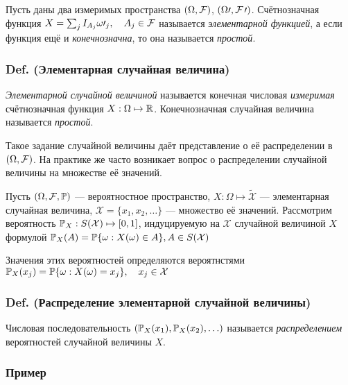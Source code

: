 Пусть даны два измеримых пространства \((\Omega, \mathcal F)\),
\((\Omega\prime, \mathcal F\prime)\). Счётнозначная функция
\hbox{$X = \sum_j I_{A_j}\omega\prime_j, \quad A_j\in\mathcal F$}
называется \emph{элементарной функцией}, а если функция ещё и
\emph{конечнозначна}, то она называется \emph{простой}.

\subsubsection{Def. (Элементарная случайная
величина)}\label{def.-ux44dux43bux435ux43cux435ux43dux442ux430ux440ux43dux430ux44f-ux441ux43bux443ux447ux430ux439ux43dux430ux44f-ux432ux435ux43bux438ux447ux438ux43dux430}

\emph{Элементарной случайной величиной} называется конечная числовая
\emph{измеримая} счётнозначная функция \(X : \Omega\mapsto\mathbb R\).
Конечнозначная случайная величина называется \emph{простой}.

Такое задание случайной величины даёт представление о её распределении в
\((\Omega, \mathcal F)\). На практике же часто возникает вопрос о
распределении случайной величины на множестве её значений.

Пусть \((\Omega, \mathcal F, \mathbb P)\) --- вероятностное пространство,
\(X : \Omega\mapsto\tilde{\mathcal X}\) --- элементарная случайная
величина, \(\mathcal X = \{ x_1, x_2, \ldots \}\) --- множество её
значений. Рассмотрим вероятность \(\mathbb P_X : S(\mathcal X)\mapsto [0,1]\),
индуцируемую на \(\mathcal X\) случайной величиной \(X\) формулой
\(\mathbb P_X(A) = \mathbb P \{\omega: X(\omega)\in A\}, A\in S(\mathcal X)\)

Значения этих вероятностей определяются вероятнстями
\(\mathbb P_X (x_j) = \mathbb P \{ \omega : X(\omega)=x_j \}, \quad x_j\in \mathcal X\)

\subsubsection{Def. (Распределение элементарной случайной
величины)}\label{def.-ux440ux430ux441ux43fux440ux435ux434ux435ux43bux435ux43dux438ux435-ux44dux43bux435ux43cux435ux43dux442ux430ux440ux43dux43eux439-ux441ux43bux443ux447ux430ux439ux43dux43eux439-ux432ux435ux43bux438ux447ux438ux43dux44b}

Числовая последовательность \(( \mathbb P_X(x_1), \mathbb P_X(x_2), \ldots )\)
называется \emph{распределением} вероятностей случайной величины \(X\).

\subsubsection{Пример}\label{ux43fux440ux438ux43cux435ux440}

